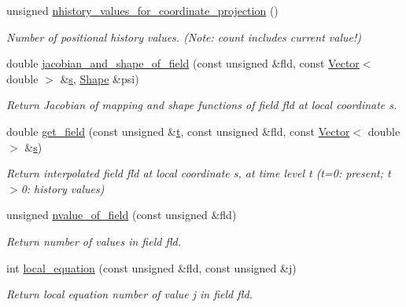 \begin{DoxyCompactItemize}
unsigned \hyperlink{classoomph_1_1ProjectableGeneralisedNewtonianCrouzeixRaviartElement_a20d7536f02164a9614ab0c4a15a1ad31}{nhistory\+\_\+values\+\_\+for\+\_\+coordinate\+\_\+projection} ()
\begin{DoxyCompactList}\small\item\em Number of positional history values. (Note\+: count includes current value!) \end{DoxyCompactList}\item 
double \hyperlink{classoomph_1_1ProjectableGeneralisedNewtonianCrouzeixRaviartElement_ae766399afa32fb3e77fb0ce9f7cb8a1c}{jacobian\+\_\+and\+\_\+shape\+\_\+of\+\_\+field} (const unsigned \&fld, const \hyperlink{classoomph_1_1Vector}{Vector}$<$ double $>$ \&\hyperlink{cfortran_8h_ab7123126e4885ef647dd9c6e3807a21c}{s}, \hyperlink{classoomph_1_1Shape}{Shape} \&psi)
\begin{DoxyCompactList}\small\item\em Return Jacobian of mapping and shape functions of field fld at local coordinate s. \end{DoxyCompactList}\item 
double \hyperlink{classoomph_1_1ProjectableGeneralisedNewtonianCrouzeixRaviartElement_a28e2853c747d88204673b6aa93f2bf62}{get\+\_\+field} (const unsigned \&\hyperlink{cfortran_8h_af6f0bd3dc13317f895c91323c25c2b8f}{t}, const unsigned \&fld, const \hyperlink{classoomph_1_1Vector}{Vector}$<$ double $>$ \&\hyperlink{cfortran_8h_ab7123126e4885ef647dd9c6e3807a21c}{s})
\begin{DoxyCompactList}\small\item\em Return interpolated field fld at local coordinate s, at time level t (t=0\+: present; t$>$0\+: history values) \end{DoxyCompactList}\item 
unsigned \hyperlink{classoomph_1_1ProjectableGeneralisedNewtonianCrouzeixRaviartElement_af5fd14a52a74dead7b8e095cb8b20cdc}{nvalue\+\_\+of\+\_\+field} (const unsigned \&fld)
\begin{DoxyCompactList}\small\item\em Return number of values in field fld. \end{DoxyCompactList}\item 
int \hyperlink{classoomph_1_1ProjectableGeneralisedNewtonianCrouzeixRaviartElement_a3bc031a4608afe535d89c3ab1b611b10}{local\+\_\+equation} (const unsigned \&fld, const unsigned \&j)
\begin{DoxyCompactList}\small\item\em Return local equation number of value j in field fld. \end{DoxyCompactList}\end{DoxyCompactItemize}
